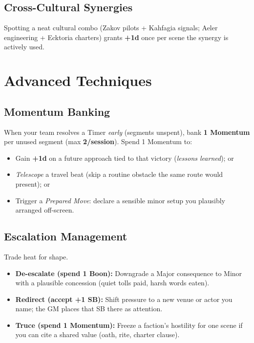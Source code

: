 \subsection{Cross-Cultural Synergies}
Spotting a neat cultural combo (Zakov pilots + Kahfagia signals; Aeler engineering + Ecktoria charters) grants \textbf{+1d} once per scene the synergy is actively used.

\section{Advanced Techniques}

\subsection{Momentum Banking}\label{subsec:momentum-banking}
When your team resolves a Timer \emph{early} (segments unspent), bank \textbf{1 Momentum} per unused segment (max \textbf{2/session}). Spend 1 Momentum to:
\begin{itemize}
  \item Gain \textbf{+1d} on a future approach tied to that victory (\emph{lessons learned}); or
  \item \emph{Telescope} a travel beat (skip a routine obstacle the same route would present); or
  \item Trigger a \emph{Prepared Move}: declare a sensible minor setup you plausibly arranged off-screen.
\end{itemize}

\subsection{Escalation Management}
Trade heat for shape.
\begin{itemize}
  \item \textbf{De-escalate (spend 1 Boon):} Downgrade a Major consequence to Minor with a plausible concession (quiet tolls paid, harsh words eaten).
  \item \textbf{Redirect (accept +1 SB):} Shift pressure to a new venue or actor you name; the GM places that SB there as attention.
  \item \textbf{Truce (spend 1 Momentum):} Freeze a faction's hostility for one scene if you can cite a shared value (oath, rite, charter clause).
\end{itemize}

